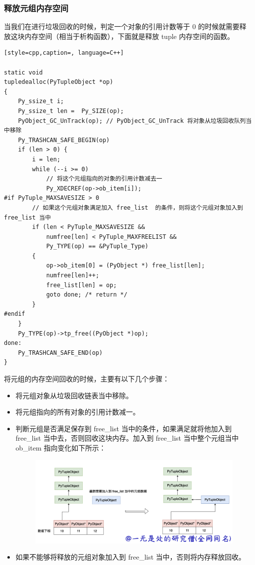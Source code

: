 \subsubsection{释放元组内存空间}
当我们在进行垃圾回收的时候，判定一个对象的引用计数等于 0 的时候就需要释放这块内存空间（相当于析构函数），下面就是释放 tuple 内存空间的函数。
\begin{lstlisting}[style=cpp,caption=, language=C++]

static void
tupledealloc(PyTupleObject *op)
{
    Py_ssize_t i;
    Py_ssize_t len =  Py_SIZE(op);
    PyObject_GC_UnTrack(op); // PyObject_GC_UnTrack 将对象从垃圾回收队列当中移除
    Py_TRASHCAN_SAFE_BEGIN(op) 
    if (len > 0) {
        i = len;
        while (--i >= 0)
            // 将这个元组指向的对象的引用计数减去一
            Py_XDECREF(op->ob_item[i]);
#if PyTuple_MAXSAVESIZE > 0
        // 如果这个元组对象满足加入 free_list  的条件，则将这个元组对象加入到 free_list 当中
        if (len < PyTuple_MAXSAVESIZE &&
            numfree[len] < PyTuple_MAXFREELIST &&
            Py_TYPE(op) == &PyTuple_Type)
        {
            op->ob_item[0] = (PyObject *) free_list[len];
            numfree[len]++;
            free_list[len] = op;
            goto done; /* return */
        }
#endif
    }
    Py_TYPE(op)->tp_free((PyObject *)op);
done:
    Py_TRASHCAN_SAFE_END(op)
}
\end{lstlisting}
将元组的内存空间回收的时候，主要有以下几个步骤：
\begin{itemize}
\item 将元组对象从垃圾回收链表当中移除。 
\item 将元组指向的所有对象的引用计数减一。 
\item 判断元组是否满足保存到 free\_list 当中的条件，如果满足就将他加入到 free\_list 当中去，否则回收这块内存。加入到 free\_list 当中整个元组当中 ob\_item 指向变化如下所示： 

    \begin{figure}[H]
        \centering
            \includegraphics[scale=.2]{images/11-tuple.png}
            \caption{ }
        \label{fig:my_label}
    \end{figure}
    
\item 如果不能够将释放的元组对象加入到 free\_list 当中，否则将内存释放回收。 
\end{itemize}
